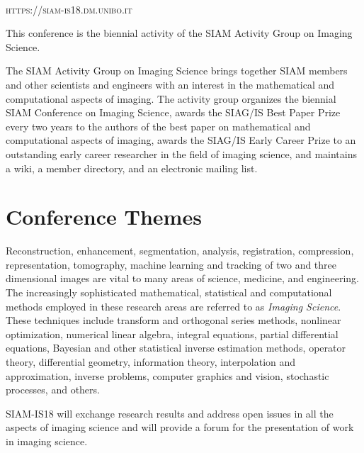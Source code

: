 
\newpage
~\vfill
\thispagestyle{empty}

\noindent \textsc{https://siam-is18.dm.unibo.it}

\bigskip

\noindent This conference is the biennial activity of the SIAM Activity Group on Imaging Science.

\vspace{0.5cm}

\noindent The SIAM Activity Group on Imaging Science brings together SIAM members and other scientists and engineers with an interest 
in the mathematical and computational aspects of imaging.
The activity group organizes the biennial SIAM Conference on Imaging Science, awards the SIAG/IS Best Paper Prize
every two years to the authors of the best paper on mathematical and computational aspects of imaging, awards the SIAG/IS 
Early Career Prize to an outstanding early career researcher in the field of imaging science, and maintains a wiki, a
member directory, and an electronic mailing list.

\newpage

\section*{Conference Themes}

Reconstruction, enhancement, segmentation, analysis, registration, compression, representation, tomography, machine learning and tracking of two and three dimensional images are vital to many areas of science, medicine, and engineering. The increasingly sophisticated mathematical, statistical and computational methods employed in these research areas are referred to as \emph{Imaging Science}.\\ 
These techniques include transform and orthogonal series methods, nonlinear optimization, numerical linear algebra, integral equations, partial differential equations, Bayesian and other statistical inverse estimation methods, operator theory, differential geometry, information theory, interpolation and approximation, inverse problems, computer graphics and vision, stochastic processes, and others.

\smallskip

SIAM-IS18 will exchange research results and address open issues in all the aspects of imaging science
and will provide a forum for the presentation of work in imaging science.


